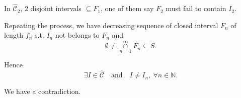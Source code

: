 \documentclass[a4paper,11pt]{article}
\begin{document}
In $\hat{\mathcal{C}}_2$, 2 disjoint intervals $\subseteq F_1$, one of them say $F_2$ must fail to contain $I_2$.

Repeating the process, we have decreasing sequence of closed interval $F_n$ of length $f_n$ s.t. $I_n$ not belongs to $F_n$ and
	$$\emptyset \neq \overset{\infty}{\underset{n = 1}{\cap}} F_n \subseteq S.$$

Hence
	$$\exists I \in \hat{\mathcal{C}}
	\quad \text{and} \quad I \neq I_n,\ \forall n \in \mathbb{N}.$$

We have a contradiction.


			
\end{document}
